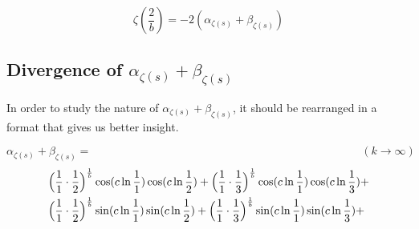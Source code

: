 \documentclass{amsart}
\begin{document}
	\[ \zeta(\frac{2}{b}) = -2(\alpha_{\zeta(s)} + \beta_{\zeta(s)}) \]
	
	\subsection{Divergence of $\alpha_{\zeta(s)} + \beta_{\zeta(s)}$}
	In order to study the nature of $\alpha_{\zeta(s)} + \beta_{\zeta(s)}$, it should be rearranged in a format that gives us better insight.
	
	\[ \alpha_{\zeta(s)} + \beta_{\zeta(s)} = \qquad\qquad\qquad\qquad\qquad\qquad\qquad\qquad\qquad\qquad\qquad\qquad (k \to \infty) \]
	\[
	\begin{aligned}
		& \Bigl( \frac{1}{1} \cdot \frac{1}{2} \Bigr)^\frac1b \cos(c \ln \frac{1}{1}) \cos(c \ln \frac{1}{2}) + \Bigl( \frac{1}{1} \cdot \frac{1}{3} \Bigr)^\frac1b \cos(c \ln \frac{1}{1}) \cos(c \ln \frac{1}{3}) + \\
		& \Bigl( \frac{1}{1} \cdot \frac{1}{2} \Bigr)^\frac1b \sin(c \ln \frac{1}{1}) \sin(c \ln \frac{1}{2}) + \Bigl( \frac{1}{1} \cdot \frac{1}{3} \Bigr)^\frac1b \sin(c \ln \frac{1}{1}) \sin(c \ln \frac{1}{3}) + 
	\end{aligned}
	\]
	
\end{document}

